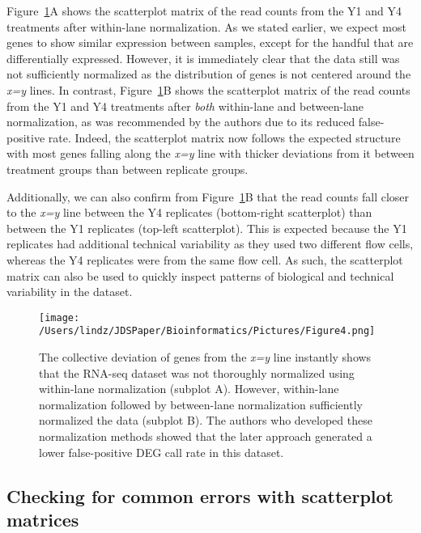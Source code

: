 \documentclass[useAMS,referee]{biom}
\begin{document}
Figure~\ref{withinbtwn}A shows the scatterplot matrix of the read counts from the Y1 and Y4 treatments after within-lane normalization. As we stated earlier, we expect most genes to show similar expression between samples, except for the handful that are differentially expressed. However, it is immediately clear that the data still was not sufficiently normalized as the distribution of genes is not centered around the \textit{x=y} lines. In contrast, Figure~\ref{withinbtwn}B shows the scatterplot matrix of the read counts from the Y1 and Y4 treatments after \textit{both} within-lane and between-lane normalization, as was recommended by the authors due to its reduced false-positive rate. Indeed, the scatterplot matrix now follows the expected structure with most genes falling along the \textit{x=y} line with thicker deviations from it between treatment groups than between replicate groups.

Additionally, we can also confirm from Figure~\ref{withinbtwn}B that the read counts fall closer to the \textit{x=y} line between the Y4 replicates (bottom-right scatterplot) than between the Y1 replicates (top-left scatterplot). This is expected because the Y1 replicates had additional technical variability as they used two different flow cells, whereas the Y4 replicates were from the same flow cell. As such, the scatterplot matrix can also be used to quickly inspect patterns of biological and technical variability in the dataset.

\begin{figure}
\begin{center}
\centerline{\texttt{[image: /Users/lindz/JDSPaper/Bioinformatics/Pictures/Figure4.png]}}
\end{center}
\caption{The collective deviation of genes from the \textit{x=y} line instantly shows that the RNA-seq dataset was not thoroughly normalized using within-lane normalization (subplot A). However, within-lane normalization followed by between-lane normalization sufficiently normalized the data (subplot B). The authors who developed these normalization methods showed that the later approach generated a lower false-positive DEG call rate in this dataset.
\label{withinbtwn}}
\end{figure}

\subsection{Checking for common errors with scatterplot matrices}
\label{s:Checking for common errors with scatterplot matrices}
\end{document}
